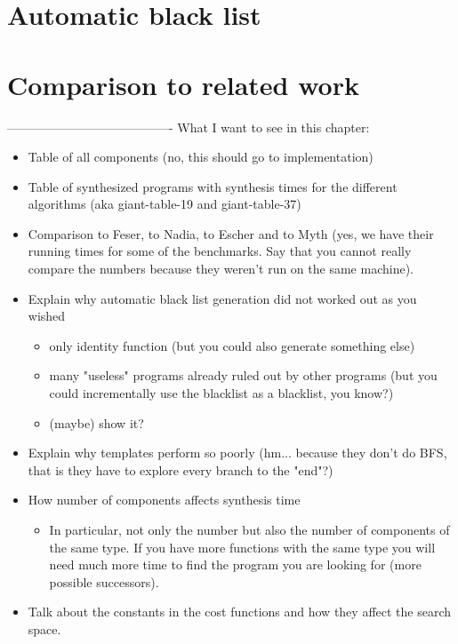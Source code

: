 \section{Automatic black list}\label{Automatic black list}

\section{Comparison to related work}








----------------------------------------
What I want to see in this chapter:
\begin{itemize}
\item Table of all components (no, this should go to implementation)
\item Table of synthesized programs with synthesis times for the different algorithms (aka giant-table-19 and giant-table-37)
\item Comparison to Feser, to Nadia, to Escher and to Myth (yes, we have their running times for some of the benchmarks. Say that you cannot really compare the numbers because they weren't run on the same machine).
\item Explain why automatic black list generation did not worked out as you wished
\begin{itemize}
\item only identity function (but you could also generate something else)
\item many "useless" programs already ruled out by other programs (but you could incrementally use the blacklist as a blacklist, you know?)
\item (maybe) show it?
\end{itemize}
\item Explain why templates perform so poorly (hm... because they don't do BFS, that is they have to explore every branch to the "end"?)
\item How number of components affects synthesis time
\begin{itemize}
\item In particular, not only the number but also the number of components of the same type. If you have more functions with the same type you will need much more time to find the program you are looking for (more possible successors).
\end{itemize} 
\item Talk about the constants in the cost functions and how they affect the search space.

\end{itemize}
